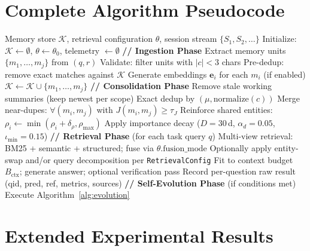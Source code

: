 \section{Complete Algorithm Pseudocode}
\label{app:full_algorithm}

\begin{algorithm}[h]
\caption{Complete \ours{} Memory Management Pipeline}
\label{alg:full_pipeline}
\begin{algorithmic}[1]
\REQUIRE Memory store $\mathcal{K}$, retrieval configuration $\theta$, session stream $\{S_1, S_2, \ldots\}$
\STATE Initialize: $\mathcal{K} \leftarrow \emptyset$, $\theta \leftarrow \theta_0$, telemetry $\leftarrow \emptyset$
    \STATE \textbf{// Ingestion Phase}
        \STATE Extract memory units $\{m_1, \ldots, m_j\}$ from $(q, r)$
        \STATE Validate: filter units with $|c| < 3$ chars
        \STATE Pre-dedup: remove exact matches against $\mathcal{K}$
        \STATE Generate embeddings $\mathbf{e}_i$ for each $m_i$ (if enabled)
        \STATE $\mathcal{K} \leftarrow \mathcal{K} \cup \{m_1, \ldots, m_j\}$
    \ENDFOR
    \STATE \textbf{// Consolidation Phase}
    \STATE Remove stale working summaries (keep newest per scope)
    \STATE Exact dedup by $(\mu, \text{normalize}(c))$
    \STATE Merge near-dupes: $\forall (m_i, m_j)$ with $J(m_i, m_j) \geq \tau_J$
    \STATE Reinforce shared entities: $\rho_i \leftarrow \min(\rho_i + \delta_\rho, \rho_{\max})$
    \STATE Apply importance decay ($D{=}30$\,d, $\alpha_d{=}0.05$, $\iota_{\min}{=}0.15$)
    \STATE \textbf{// Retrieval Phase} (for each task query $q$)
    \STATE Multi-view retrieval: BM25 + semantic + structured; fuse via $\theta.\text{fusion\_mode}$
    \STATE Optionally apply entity-swap and/or query decomposition per \texttt{RetrievalConfig}
    \STATE Fit to context budget $B_{\text{ctx}}$; generate answer; optional verification pass
    \STATE Record per-question raw result (qid, pred, ref, metrics, sources)
    \STATE \textbf{// Self-Evolution Phase} (if conditions met)
        \STATE Execute Algorithm~\ref{alg:evolution}
    \ENDIF
\ENDFOR
\end{algorithmic}
\end{algorithm}

\section{Extended Experimental Results}
\label{app:extended_results}


